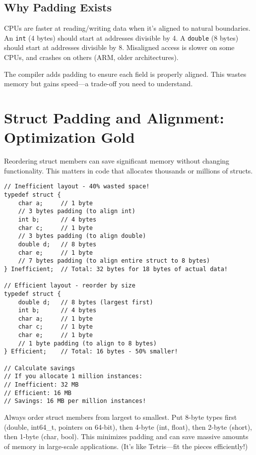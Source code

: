 \subsection{Why Padding Exists}

CPUs are faster at reading/writing data when it's aligned to natural boundaries. An \texttt{int} (4 bytes) should start at addresses divisible by 4. A \texttt{double} (8 bytes) should start at addresses divisible by 8. Misaligned access is slower on some CPUs, and crashes on others (ARM, older architectures).

The compiler adds padding to ensure each field is properly aligned. This wastes memory but gains speed—a trade-off you need to understand.

\section{Struct Padding and Alignment: Optimization Gold}

Reordering struct members can save significant memory without changing functionality. This matters in code that allocates thousands or millions of structs.

\begin{lstlisting}
// Inefficient layout - 40% wasted space!
typedef struct {
    char a;     // 1 byte
    // 3 bytes padding (to align int)
    int b;      // 4 bytes
    char c;     // 1 byte
    // 3 bytes padding (to align double)
    double d;   // 8 bytes
    char e;     // 1 byte
    // 7 bytes padding (to align entire struct to 8 bytes)
} Inefficient;  // Total: 32 bytes for 18 bytes of actual data!

// Efficient layout - reorder by size
typedef struct {
    double d;   // 8 bytes (largest first)
    int b;      // 4 bytes
    char a;     // 1 byte
    char c;     // 1 byte
    char e;     // 1 byte
    // 1 byte padding (to align to 8 bytes)
} Efficient;    // Total: 16 bytes - 50% smaller!

// Calculate savings
// If you allocate 1 million instances:
// Inefficient: 32 MB
// Efficient: 16 MB
// Savings: 16 MB per million instances!
\end{lstlisting}

\begin{tipbox}
Always order struct members from largest to smallest. Put 8-byte types first (double, int64\_t, pointers on 64-bit), then 4-byte (int, float), then 2-byte (short), then 1-byte (char, bool). This minimizes padding and can save massive amounts of memory in large-scale applications. (It's like Tetris—fit the pieces efficiently!)
\end{tipbox}

